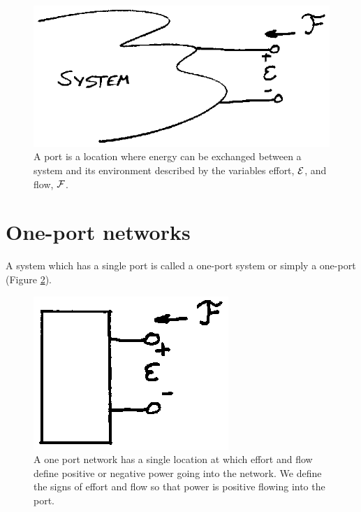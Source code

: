 \begin{figure}[h]	%
\centering \includegraphics{figs14/00301.eps}
\caption{A port is a location where energy can be exchanged between a system and its environment described by the variables effort, $\mathcal{E}$, and flow, $\mathcal{F}$.}\label{GeneralPort}	%
\end{figure}	%


\section{One-port networks}

A system which has a single port is called a one-port system or simply a one-port (Figure \ref{OnePort}).	%

\begin{figure}[h]	%
\centering \includegraphics{figs14/00302.eps}
\caption{A one port network has a single location at which effort and flow define positive or negative power going into the network. We define the signs of effort and flow so that power is positive flowing into the port. }\label{OnePort}	%
\end{figure}	%

